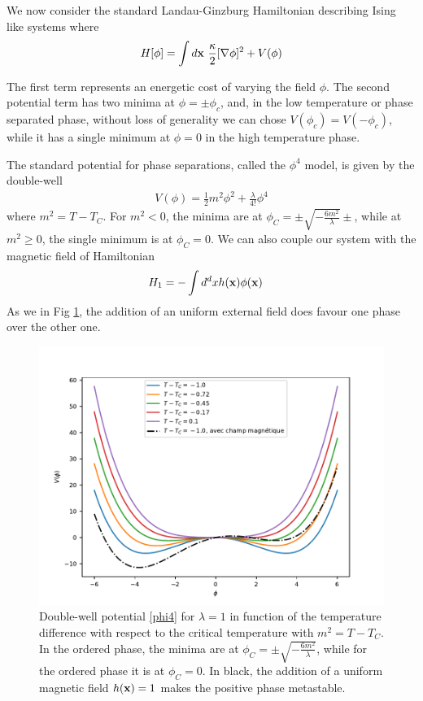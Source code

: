 We now consider the standard Landau-Ginzburg Hamiltonian \cite{l_landau_physique_1990} describing Ising like systems where
\begin{equation}
H[\phi] = \int d{\bf x} \ \frac{\kappa}{2}[\nabla \phi]^2 + V(\phi)
\label{landau-ginzburg-hamiltonian}
\end{equation}

The first term represents an energetic cost of varying the field $\phi$. The second potential term has two minima at $\phi=\pm \phi_c$, and, in the low temperature or phase separated phase, without loss of generality we can chose $V(\phi_c)=V(-\phi_c)$, while it has a single minimum at $\phi=0$ in the high temperature phase.

The standard potential for phase separations, called the $\phi^4$ model, is given by the double-well
\begin{align}
V(\phi) = \frac{1}{2} m^2 \phi^2 + \frac{\lambda}{4!} \phi^4
\label{phi4}
\end{align} 
where $m^2 = T-T_C$. For $m^2 \less 0$, the minima are at $\phi_C = \pm \sqrt{- \frac{6 m^2}{\lambda} } \pm$, while at $m^2 \ge 0$, the single minimum is at $\phi_C = 0$. We can also couple our system with the magnetic field of Hamiltonian
\begin{align}
H_1 &= - \int d^dx h({\bf x})\phi({\bf x})
\label{champ-externe}
\end{align}
As we in Fig \ref{double-puits-temperature}, the addition of an uniform external field does favour one phase over the other one.


\begin{figure}
\centering
\includegraphics[width=0.6\linewidth]{intro/double-puit-en-fonction-temp.pdf}
\caption{Double-well potential \eqref{phi4} for $\lambda=1$ in function of the temperature difference with respect to the critical temperature with $m^2 = T-T_C$. In the ordered phase, the minima are at $\phi_C =\pm \sqrt{- \frac{6 m^2}{\lambda} } $, while for the ordered phase it is at $\phi_C = 0$. In black, the addition of a uniform magnetic field $h({\bf x}) = 1$ makes the positive phase metastable.}
\label{double-puits-temperature}
\end{figure}


